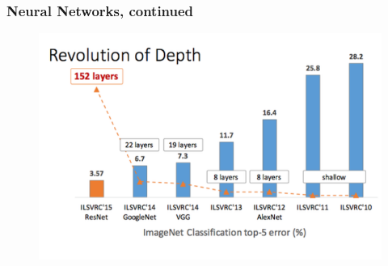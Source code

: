 \documentclass[a4,xcolor=dvipsnames]{beamer}
\begin{document}
\begin{frame}
    \frametitle{Neural Networks, continued}
    \begin{figure}
        \centering
        \includegraphics[width=.7\textwidth]{depth.png}
    \end{figure}
\end{frame}
\end{document}
